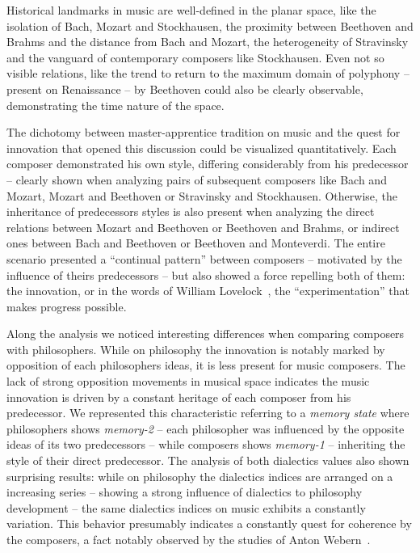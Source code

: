 \documentclass[
 aip,
 jmp,
 amsmath,amssymb,
 reprint,
]{revtex4-1}
\begin{document}
Historical landmarks in music are
well-defined in the planar space, like the isolation of Bach, Mozart
and Stockhausen, the
proximity between Beethoven and Brahms and the distance from Bach and Mozart, the heterogeneity of
Stravinsky and the vanguard of contemporary composers
like Stockhausen. Even not so visible relations, like the trend to return to the
maximum domain of polyphony -- present on Renaissance -- by Beethoven
could also be clearly observable, demonstrating the time nature of the
space. 

The dichotomy between
master-apprentice tradition on music and the quest for innovation that
opened this discussion could be visualized quantitatively. Each
composer demonstrated his own style, differing considerably from his
predecessor -- clearly shown when analyzing pairs of subsequent composers like
Bach and Mozart, Mozart and Beethoven or Stravinsky and
Stockhausen. Otherwise, the inheritance of predecessors styles is also
present when analyzing the direct relations between Mozart and
Beethoven or Beethoven and
Brahms, or indirect ones between Bach and Beethoven
or Beethoven and Monteverdi. The entire scenario presented
a ``continual pattern'' between
composers -- motivated by the influence of theirs predecessors -- but also showed a force
repelling both of them: the innovation, or in the words of William
Lovelock~\cite{Lovelock}, the ``experimentation'' that makes progress possible.

Along the analysis we noticed interesting differences when comparing
composers with philosophers. While on philosophy the
innovation is notably marked by opposition of each philosophers ideas,
it is less present for music composers. The lack of strong
opposition movements in musical space indicates the music innovation is driven by
a constant heritage of each composer from his predecessor. We
represented this characteristic referring to a \textit{memory state}
where philosophers shows \textit{memory-2} -- each philosopher was
influenced by the opposite ideas of its two predecessors -- while
composers shows \textit{memory-1} -- inheriting the style of their direct
predecessor. 
The
analysis of both dialectics values also shown surprising
results: while on philosophy the dialectics indices are arranged on a
increasing series -- showing a strong influence of
dialectics to philosophy development -- the same dialectics indices on
music exhibits a constantly variation. This behavior presumably indicates a
constantly quest for coherence by the composers, a fact notably observed by
the studies of Anton Webern~\cite{Webern}.
\end{document}
